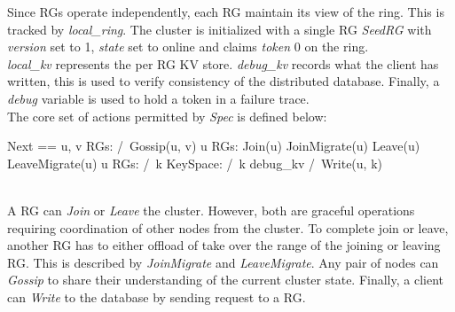 Since RGs operate independently, each RG maintain its view of the ring. This is
tracked by \textit{local\_ring}. The cluster is initialized with a single RG
\textit{SeedRG} with \textit{version} set to 1, \textit{state} set to online and
claims \textit{token} 0 on the ring.\\

\textit{local\_kv} represents the per RG KV store. \textit{debug\_kv} records
what the client has written, this is used to verify consistency of the
distributed database. Finally, a \textit{debug} variable is used to hold a token
in a failure trace.\\

The core set of actions permitted by \textit{Spec} is defined below:\\
\begin{tla}
Next ==
    \/ \E u, v \in RGs:
        /\ Gossip(u, v)
    \/ \E u \in RGs:
        \/ Join(u) 
        \/ JoinMigrate(u)
        \/ Leave(u)
        \/ LeaveMigrate(u)
    \/ \E u \in RGs:
        /\ \E k \in KeySpace:
            /\ k \notin debug_kv
            /\ Write(u, k)
\end{tla}
\begin{tlatex}
%
%
%
%
%
%
%
%
%
%
%
%
\end{tlatex}
\\

A RG can \textit{Join} or \textit{Leave} the cluster. However, both are graceful
operations requiring coordination of other nodes from the cluster. To complete
join or leave, another RG has to either offload of take over the range of the
joining or leaving RG.  This is described by \textit{JoinMigrate} and
\textit{LeaveMigrate}. Any pair of nodes can \textit{Gossip} to share their
understanding of the current cluster state. Finally, a client can \textit{Write}
to the database by sending request to a RG.\\

